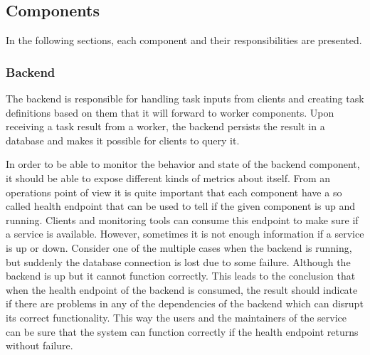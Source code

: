 \subsection{Components}

In the following sections, each component and their responsibilities are presented.

\subsubsection{Backend} \label{design-backend}

%

The backend is responsible for handling task inputs from clients and creating task definitions based on them that it will forward to worker components. Upon receiving a task result from a worker, the backend persists the result in a database and makes it possible for clients to query it.

In order to be able to monitor the behavior and state of the backend component, it should be able to expose different kinds of metrics about itself. From an operations point of view it is quite important that each component have a so called health endpoint that can be used to tell if the given component is up and running. Clients and monitoring tools can consume this endpoint to make sure if a service is available. However, sometimes it is not enough information if a service is up or down. Consider one of the multiple cases when the backend is running, but suddenly the database connection is lost due to some failure. Although the backend is up but it cannot function correctly. This leads to the conclusion that when the health endpoint of the backend is consumed, the result should indicate if there are problems in any of the dependencies of the backend which can disrupt its correct functionality. This way the users and the maintainers of the service can be sure that the system can function correctly if the health endpoint returns without failure.

